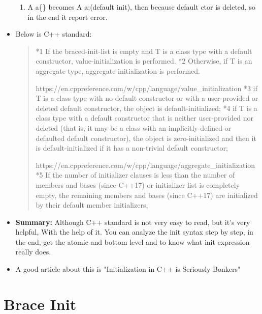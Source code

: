 \documentclass[a4paper,11pt,twoside]{book}
\begin{document}
\begin{itemize}
\begin{enumerate}
	\item A a\{\} becomes A a;(default init), then because default ctor is deleted, so in the end it report error.
\end{enumerate}


	\item Below is C++ standard:
	\begin{quote}
*1 If the braced-init-list is empty and T is a class type with a default constructor, value-initialization is performed. \newline
*2 Otherwise, if T is an aggregate type, aggregate initialization is performed.
\newline

https://en.cppreference.com/w/cpp/language/value\_initialization \newline
*3 if T is a class type with no default constructor or with a user-provided or deleted default constructor, the object is default-initialized; \newline
*4 if T is a class type with a default constructor that is neither user-provided nor deleted (that is, it may be a class with an implicitly-defined or defaulted default constructor), the object is zero-initialized and then it is default-initialized if it has a non-trivial default constructor; \newline

https://en.cppreference.com/w/cpp/language/aggregate\_initialization \newline
*5 If the number of initializer clauses is less than the number of members and bases (since C++17) or initializer list is completely empty, the remaining members and bases (since C++17) are initialized by their default member initializers,
	\end{quote}



	\item \textbf{Summary:} Although C++ standard is not very easy to read, but it's very helpful, With the help of it. You can analyze the init syntax step by step, in the end, get the atomic and bottom level and to know what init expression really does.
	
	\item A good article about this is "Initialization in C++ is Seriously Bonkers"
	
\end{itemize}

\section{Brace Init}
\end{document}
